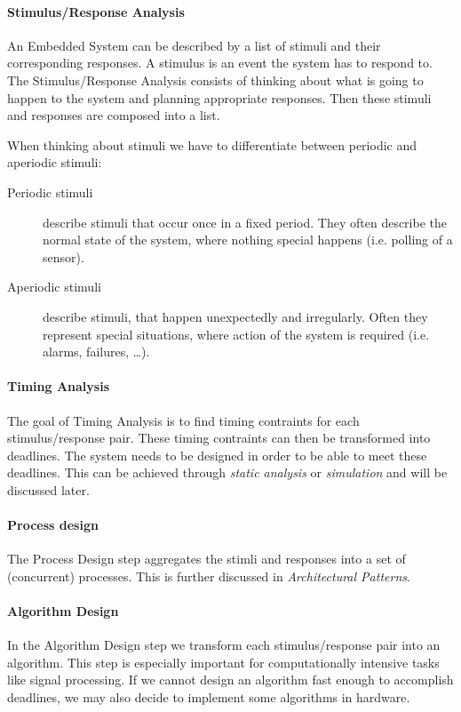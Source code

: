 \documentclass[10pt,a4paper,titlepage,draft]{article} %
\begin{document}
\paragraph{Stimulus/Response Analysis}
An Embedded System can be described by a list of stimuli and their corresponding responses.
A stimulus is an event the system has to respond to.
The Stimulus/Response Analysis consists of thinking about what is going to happen to the system and planning appropriate responses.
Then these stimuli and responses are composed into a list.

When thinking about stimuli we have to differentiate between periodic and aperiodic stimuli:
\begin{description}
	\item[Periodic stimuli] describe stimuli that occur once in a fixed period.
	They often describe the normal state of the system, where nothing special happens (i.e. polling of a sensor).
	\item[Aperiodic stimuli] describe stimuli, that happen unexpectedly and irregularly.
	Often they represent special situations, where action of the system is required (i.e. alarms, failures, \dots).
\end{description}

\paragraph{Timing Analysis}
The goal of Timing Analysis is to find timing contraints for each stimulus/response pair.
These timing contraints can then be transformed into deadlines.
The system needs to be designed in order to be able to meet these deadlines.
This can be achieved through \emph{static analysis} or \emph{simulation} and will be discussed later.

\paragraph{Process design}
The Process Design step aggregates the stimli and responses into a set of (concurrent) processes.
This is further discussed in \emph{Architectural Patterns}.

\paragraph{Algorithm Design}
In the Algorithm Design step we transform each stimulus/response pair into an algorithm.
This step is especially important for computationally intensive tasks like signal processing.
If we cannot design an algorithm fast enough to accomplish deadlines, we may also decide to implement some algorithms in hardware.
\end{document}

